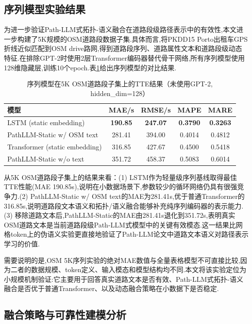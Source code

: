 \documentclass{rjthesis}
\begin{document}
\subsection{序列模型实验结果}

为进一步验证Path-LLM式拓扑-语义融合在道路段级路径表示中的有效性,本文进一步构建了5K规模的OSM道路段数据子集.具体而言,将PKDD15 Porto出租车GPS折线近似匹配到OSM drive路网,得到道路段序列、道路属性文本和道路段级动态特征.在排除GPT-2时使用2层Transformer编码器替代骨干网络,所有序列模型使用128维隐藏层,训练10个epoch.表\ref{tab:neural_results}给出序列模型的对比结果.

\begin{table}[htbp]
	\centering
	\caption{序列模型在5K OSM道路段子集上的TTE结果（未使用GPT-2, hidden\_dim=128）}
	\label{tab:neural_results}
	\begin{tabular}{lcccc}
		\toprule
		模型 & MAE/s & RMSE/s & MAPE & MARE \\
		\midrule
		LSTM (static embedding) & \textbf{190.85} & \textbf{247.07} & \textbf{0.3790} & \textbf{0.3263} \\
		PathLLM-Static w/ OSM text & 281.41 & 394.00 & 0.4014 & 0.4812 \\
		Transformer (static embedding) & 316.85 & 427.67 & 0.4500 & 0.5418 \\
		PathLLM-Static w/o text & 351.72 & 458.37 & 0.5083 & 0.6014 \\
		\bottomrule
	\end{tabular}
\end{table}

从5K OSM道路段子集上的结果来看：(1) LSTM作为轻量级序列基线取得最佳TTE性能(MAE 190.85s),说明在小数据场景下,参数较少的循环网络仍具有很强竞争力.(2) PathLLM-Static w/ OSM text的MAE为281.41s,优于普通Transformer的316.85s,说明道路段文本语义和拓扑/语义融合能够补充纯序列编码器的表示能力.(3) 移除道路文本后,PathLLM-Static的MAE由281.41s退化到351.72s,表明真实OSM道路文本是当前道路段级Path-LLM式模型中的关键有效模态.这一结果比网格token上的伪语义实验更直接地验证了Path-LLM论文中道路文本语义对路径表示学习的价值.

需要说明的是,OSM 5K序列实验的绝对MAE数值与全量表格模型不可直接比较,因为二者的数据规模、token定义、输入模态和模型结构均不同.本文将该实验定位为小规模机制验证:它主要用于回答真实道路文本是否有效、Path-LLM式拓扑-语义融合是否优于普通Transformer、以及动态融合策略在小数据下是否稳定.

\subsection{融合策略与可靠性建模分析}
\end{document}
